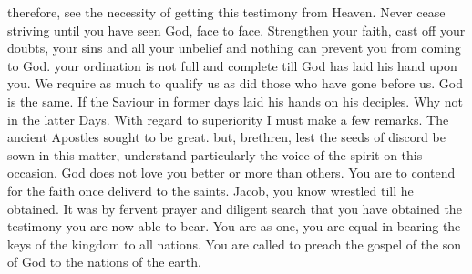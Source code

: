 					therefore, see the necessity of getting this testimony from Heaven. Never cease striving until you have seen God, face to face. Strengthen your faith, cast off your doubts, your sins and all your unbelief and nothing can prevent you from coming to God. your ordination is not full and complete till God has laid his hand upon you. We require as much to qualify us as did those who have gone before us. God is the same. If the Saviour in former days laid his hands on his deciples. Why not in the latter Days. With regard to superiority I must make a few remarks. The ancient Apostles sought to be great. but, brethren, lest the seeds of discord be sown in this matter, understand particularly the voice of the spirit on this occasion. God does not love you better or more than others. You are to contend for the faith once deliverd to the saints. Jacob, you know wrestled till he obtained. It was by fervent prayer and diligent search that you have obtained the testimony you are now able to bear. You are as one, you are equal in bearing the keys of the kingdom to all nations. You are called to preach the gospel of the son of God to the nations of the earth.
							
